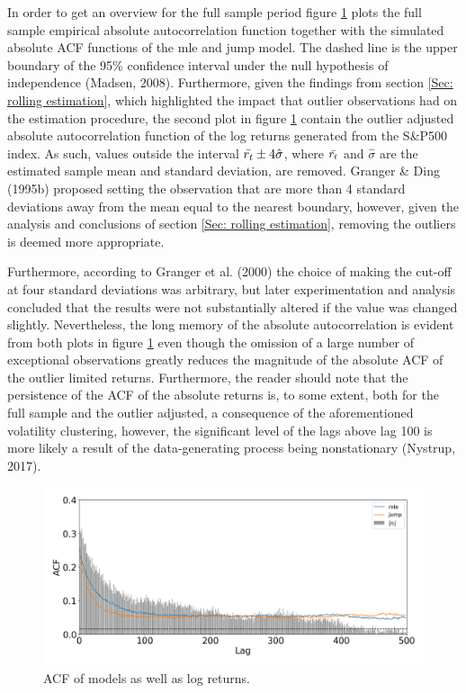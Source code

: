  In order to get an overview for the full sample period figure \ref{fig:stylized_facts_acf_plots} plots the full sample empirical absolute autocorrelation function together with the simulated absolute ACF functions of the mle and jump model. The dashed line is the upper boundary of the 95\% confidence interval under the null hypothesis of independence (Madsen, 2008). Furthermore, given the findings from section \ref{Sec: rolling estimation}, which highlighted the impact that outlier observations had on the estimation procedure, the second plot in figure \ref{fig:stylized_facts_acf_plots} contain the outlier adjusted absolute autocorrelation function of the log returns generated from the S\&P500 index. As such, values outside the interval $\Bar{r_t}\pm 4\hat{\sigma}$, where $\Bar{r_t}$ and $\hat{\sigma}$ are the estimated sample mean and standard deviation, are removed. Granger \& Ding (1995b) proposed setting the observation that are more than 4 standard deviations away from the mean equal to the nearest boundary, however, given the analysis and conclusions of section \ref{Sec: rolling estimation}, removing the outliers is deemed more appropriate. 

Furthermore, according to Granger et al. (2000) the choice of making the cut-off at four standard deviations was arbitrary, but later experimentation and analysis concluded that the results were not
substantially altered if the value was changed slightly. Nevertheless, the long memory of the absolute autocorrelation is evident from both plots in figure \ref{fig:stylized_facts_acf_plots} even though the omission of a large number of exceptional observations greatly reduces the magnitude of the absolute ACF of the outlier limited returns. Furthermore, the reader should note that the persistence of the ACF of the absolute returns is, to some extent, both for the full sample and the outlier adjusted, a consequence of the aforementioned volatility clustering, however, the significant level of the lags above lag 100 is more likely a result of the data-generating process being nonstationary (Nystrup, 2017). 

\begin{figure}[H] 
    \centering
    \includegraphics[width=1.0\textwidth]{analysis/stylized_facts/images/acf_abs.png}
    \caption{ACF of models as well as log returns.}
    \label{fig:stylized_facts_acf_plots} 
\end{figure}


